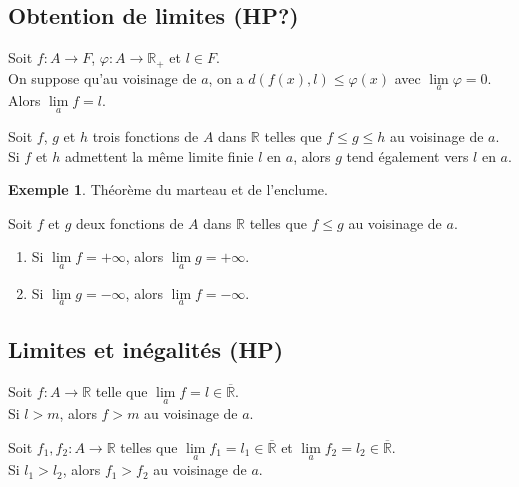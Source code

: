 \documentclass[french]{article}
\newcommand{\R}{\mathbb{R}}
\theoremstyle{plain}
\theoremstyle{definition}
\newtheorem*{ex}{Exemple}
\theoremstyle{remark}
\begin{document}
\subsection{Obtention de limites (HP?)}

\begin{prop}%
	Soit $f:A\to F$, $\varphi:A\to\R_+$ et $l\in F$. \\
	On suppose qu'au voisinage de $a$, on a $d(f(x),l)\leqslant\varphi(x)$ avec $\underset{a}{\lim}\varphi=0$. \\
	Alors $\underset{a}{\lim}f=l$.
\end{prop}

\begin{prop}%
	Soit $f$, $g$ et $h$ trois fonctions de $A$ dans $\R$ telles que $f\leqslant g\leqslant h$ au voisinage de $a$. Si $f$ et $h$ admettent la même limite finie $l$ en $a$, alors $g$ tend également vers $l$ en $a$.
\end{prop}

\begin{ex}
	Théorème du marteau et de l'enclume. %
\end{ex}

\begin{prop}%
	Soit $f$ et $g$ deux fonctions de $A$ dans $\R$ telles que $f\leqslant g$ au voisinage de $a$.
	\begin{enumerate}
		\item Si $\underset{a}{\lim}f=+\infty$, alors $\underset{a}{\lim}g=+\infty$.
		\item Si $\underset{a}{\lim}g=-\infty$, alors $\underset{a}{\lim}f=-\infty$.
	\end{enumerate}
\end{prop}

\subsection{Limites et inégalités (HP)}

\begin{prop}%
	Soit $f:A\to\R$ telle que $\underset{a}{\lim}f=l\in\overline{\R}$.\\
	Si $l>m$, alors $f>m$ au voisinage de $a$.
\end{prop}

\begin{cor}%
	Soit $f_1,f_2:A\to\R$ telles que $\underset{a}{\lim}f_1=l_1\in\overline{\R}$ et $\underset{a}{\lim}f_2=l_2\in\overline{\R}$.\\
	Si $l_1>l_2$, alors $f_1>f_2$ au voisinage de $a$.
\end{cor}
\end{document}

